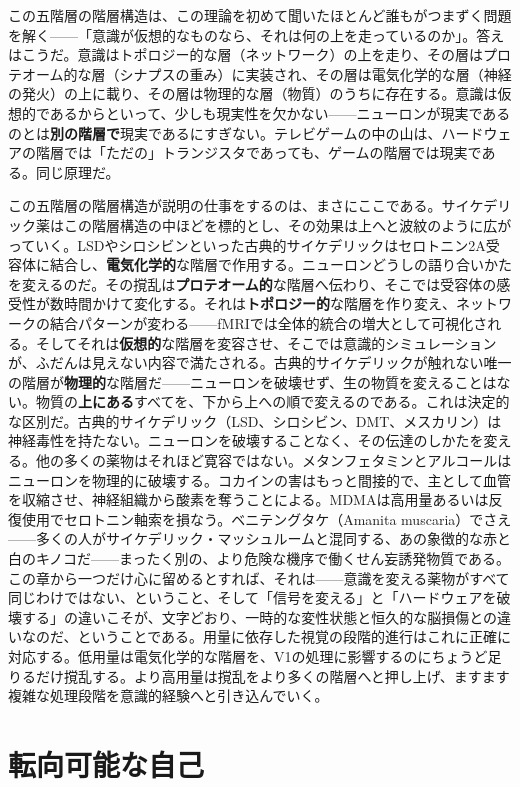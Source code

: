 \documentclass[11pt, twoside, openright]{book}
\begin{document}
この五階層の階層構造は、この理論を初めて聞いたほとんど誰もがつまずく問題を解く------「意識が仮想的なものなら、それは何の上を走っているのか」。答えはこうだ。意識はトポロジー的な層（ネットワーク）の上を走り、その層はプロテオーム的な層（シナプスの重み）に実装され、その層は電気化学的な層（神経の発火）の上に載り、その層は物理的な層（物質）のうちに存在する。意識は仮想的であるからといって、少しも現実性を欠かない------ニューロンが現実であるのとは\textbf{別の階層で}現実であるにすぎない。テレビゲームの中の山は、ハードウェアの階層では「ただの」トランジスタであっても、ゲームの階層では現実である。同じ原理だ。

この五階層の階層構造が説明の仕事をするのは、まさにここである。サイケデリック薬はこの階層構造の中ほどを標的とし、その効果は上へと波紋のように広がっていく。LSDやシロシビンといった古典的サイケデリックはセロトニン2A受容体に結合し、\textbf{電気化学的}な階層で作用する。ニューロンどうしの語り合いかたを変えるのだ。その撹乱は\textbf{プロテオーム的}な階層へ伝わり、そこでは受容体の感受性が数時間かけて変化する。それは\textbf{トポロジー的}な階層を作り変え、ネットワークの結合パターンが変わる------fMRIでは全体的統合の増大として可視化される。そしてそれは\textbf{仮想的}な階層を変容させ、そこでは意識的シミュレーションが、ふだんは見えない内容で満たされる。古典的サイケデリックが触れない唯一の階層が\textbf{物理的}な階層だ------ニューロンを破壊せず、生の物質を変えることはない。物質の\textbf{上にある}すべてを、下から上への順で変えるのである。これは決定的な区別だ。古典的サイケデリック（LSD、シロシビン、DMT、メスカリン）は神経毒性を持たない。ニューロンを破壊することなく、その伝達のしかたを変える。他の多くの薬物はそれほど寛容ではない。メタンフェタミンとアルコールはニューロンを物理的に破壊する。コカインの害はもっと間接的で、主として血管を収縮させ、神経組織から酸素を奪うことによる。MDMAは高用量あるいは反復使用でセロトニン軸索を損なう。ベニテングタケ（Amanita muscaria）でさえ------多くの人がサイケデリック・マッシュルームと混同する、あの象徴的な赤と白のキノコだ------まったく別の、より危険な機序で働くせん妄誘発物質である。この章から一つだけ心に留めるとすれば、それは------意識を変える薬物がすべて同じわけではない、ということ、そして「信号を変える」と「ハードウェアを破壊する」の違いこそが、文字どおり、一時的な変性状態と恒久的な脳損傷との違いなのだ、ということである。用量に依存した視覚の段階的進行はこれに正確に対応する。低用量は電気化学的な階層を、V1の処理に影響するのにちょうど足りるだけ撹乱する。より高用量は撹乱をより多くの階層へと押し上げ、ますます複雑な処理段階を意識的経験へと引き込んでいく。

\section*{転向可能な自己}
\end{document}
